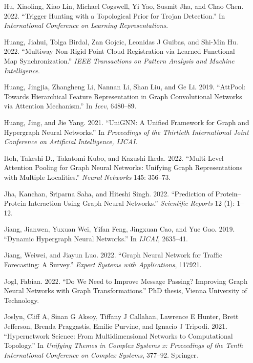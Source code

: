 \documentclass[
  12pt,
]{krantz}
\newlength{\cslhangindent}
\newenvironment{CSLReferences}[2] %
 {\begin{list}{}{%
  \setlength{\itemindent}{0pt}
  \setlength{\leftmargin}{0pt}
  \setlength{\parsep}{0pt}
  \ifodd #1
   \setlength{\leftmargin}{\cslhangindent}
   \setlength{\itemindent}{-1\cslhangindent}
  \fi
  \setlength{\itemsep}{#2\baselineskip}}}
 {\end{list}}
\begin{document}
\begin{CSLReferences}{1}{0}
Hu, Xiaoling, Xiao Lin, Michael Cogswell, Yi Yao, Susmit Jha, and Chao
Chen. 2022. {``Trigger Hunting with a Topological Prior for {T}rojan
Detection.''} In \emph{International Conference on Learning
Representations}.

Huang, Jiahui, Tolga Birdal, Zan Gojcic, Leonidas J Guibas, and Shi-Min
Hu. 2022. {``Multiway Non-Rigid Point Cloud Registration via Learned
Functional Map Synchronization.''} \emph{IEEE Transactions on Pattern
Analysis and Machine Intelligence}.

Huang, Jingjia, Zhangheng Li, Nannan Li, Shan Liu, and Ge Li. 2019.
{``Att{P}ool: Towards Hierarchical Feature Representation in Graph
Convolutional Networks via Attention Mechanism.''} In \emph{Iccv},
6480--89.

Huang, Jing, and Jie Yang. 2021. {``Uni{GNN}: A Unified Framework for
Graph and Hypergraph Neural Networks.''} In \emph{Proceedings of the
Thirtieth International Joint Conference on Artificial Intelligence,
{IJCAI}}.

Itoh, Takeshi D., Takatomi Kubo, and Kazushi Ikeda. 2022. {``Multi-Level
Attention Pooling for Graph Neural Networks: Unifying Graph
Representations with Multiple Localities.''} \emph{Neural Networks} 145:
356--73.

Jha, Kanchan, Sriparna Saha, and Hiteshi Singh. 2022. {``Prediction of
Protein--Protein Interaction Using Graph Neural Networks.''}
\emph{Scientific Reports} 12 (1): 1--12.

Jiang, Jianwen, Yuxuan Wei, Yifan Feng, Jingxuan Cao, and Yue Gao. 2019.
{``Dynamic Hypergraph Neural Networks.''} In \emph{IJCAI}, 2635--41.

Jiang, Weiwei, and Jiayun Luo. 2022. {``Graph Neural Network for Traffic
Forecasting: A Survey.''} \emph{Expert Systems with Applications},
117921.

Jogl, Fabian. 2022. {``Do We Need to Improve Message Passing? Improving
Graph Neural Networks with Graph Transformations.''} PhD thesis, Vienna
University of Technology.

Joslyn, Cliff A, Sinan G Aksoy, Tiffany J Callahan, Lawrence E Hunter,
Brett Jefferson, Brenda Praggastis, Emilie Purvine, and Ignacio J
Tripodi. 2021. {``Hypernetwork Science: From Multidimensional Networks
to Computational Topology.''} In \emph{Unifying Themes in Complex
Systems x: Proceedings of the Tenth International Conference on Complex
Systems}, 377--92. Springer.


\end{CSLReferences}
\end{document}

